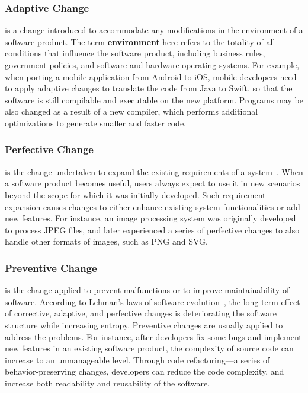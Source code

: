 \documentclass[runningheads,a4paper]{llncs}
\begin{document}
\subsubsection{Adaptive Change} is a change introduced to accommodate any modifications in the environment of a software product. The term \textbf{environment} here refers to the totality of all conditions that influence the software product, including business rules, government policies, and software and hardware operating systems. For example, when porting a mobile application from Android to iOS, mobile developers need to apply adaptive changes to translate the code from Java to Swift, so that the software is still compilable and executable on the new platform. Programs may be also changed as a result of a new compiler, which performs additional optimizations to generate smaller and faster code. 

\subsubsection{Perfective Change} is the change undertaken to expand the existing requirements of a system~\cite{Seaman2008:SMC}. When a software product becomes useful, users always expect to use it in new scenarios beyond the scope for which it was initially developed. Such requirement expansion causes changes to either enhance existing system functionalities or add new features. For instance, an image processing system was originally developed to process JPEG files, and later experienced a series of perfective changes to also handle other formats of images, such as PNG and SVG.

\subsubsection{Preventive Change} is the change applied to prevent malfunctions or to improve maintainability of software. 
According to Lehman's laws of software evolution~\cite{Lehman1984:ULE}, the long-term effect of corrective, adaptive, and perfective changes is deteriorating the software structure while increasing entropy. Preventive changes are usually applied to address the problems. For instance, after developers fix some bugs and implement new features in an existing software product, the complexity of source code can increase to an unmanageable level. Through code refactoring---a series of behavior-preserving changes, developers can reduce the code complexity, and increase both readability and reusability of the software.
\end{document}
